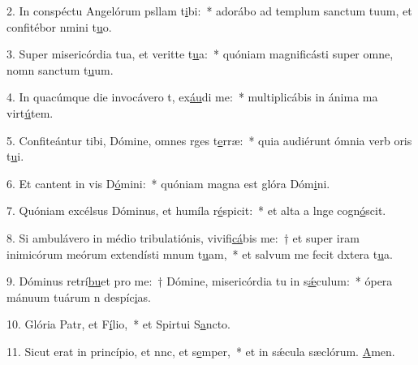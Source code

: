 2. In conspéctu Angelórum psllam t\uline{i}bi:~* adorábo ad templum sanctum tuum, et confitébor nmini t\uline{u}o.\par 
3. Super misericórdia tua, et veritte t\uline{u}a:~* quóniam magnificásti super omne, nomn sanctum t\uline{u}um.\par 
4. In quacúmque die invocávero t, ex\uline{áu}di me:~* multiplicábis in ánima ma virt\uline{ú}tem.\par 
5. Confiteántur tibi, Dómine, omnes rges t\uline{e}rræ:~* quia audiérunt ómnia verb oris t\uline{u}i.\par 
6. Et cantent in vis D\uline{ó}mini:~* quóniam magna est glóra Dóm\uline{i}ni.\par 
7. Quóniam excélsus Dóminus, et humíla r\uline{é}spicit:~* et alta a lnge cogn\uline{ó}scit.\par 
8. Si ambulávero in médio tribulatiónis, vivifi\uline{cá}bis me:~† et super iram inimicórum meórum extendísti mnum t\uline{u}am,~* et salvum me fecit dxtera t\uline{u}a.\par 
9. Dóminus retrí\uline{bu}et pro me:~† Dómine, misericórdia tu in s\uline{ǽ}culum:~* ópera mánuum tuárum n despíc\uline{i}as.\par 
10. Glória Patr, et F\uline{í}lio,~* et Spirtui S\uline{a}ncto.\par 
11. Sicut erat in princípio, et nnc, et s\uline{e}mper,~* et in sǽcula sæclórum. \uline{A}men.\par 
